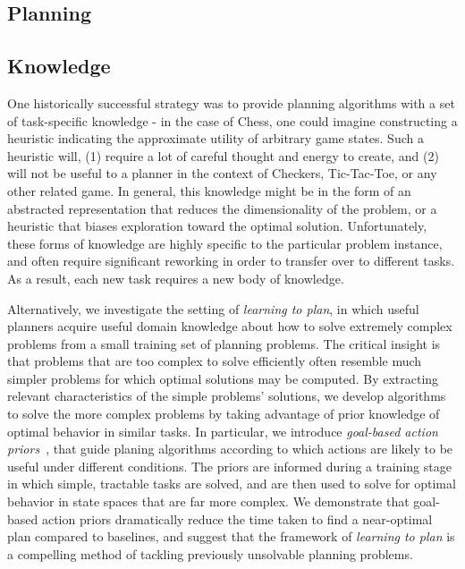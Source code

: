 \documentclass[11pt]{article}
\begin{document}
\subsection{Planning}



\subsection{Knowledge}
One historically successful strategy was to provide planning algorithms with a set of task-specific knowledge - in the case of Chess, one could imagine constructing a heuristic indicating the approximate utility of arbitrary game states. Such a heuristic will, (1) require a lot of careful thought and energy to create, and (2) will not be useful to a planner in the context of Checkers, Tic-Tac-Toe, or any other related game. In general, this knowledge might be in the form of an abstracted representation that reduces the dimensionality of the problem, or a heuristic that biases exploration toward the optimal solution. Unfortunately, these forms of knowledge are highly specific to the particular problem instance, and often require significant reworking in order to transfer over to different tasks. As a result, each new task requires a new body of knowledge. 

Alternatively, we investigate the setting of {\it learning to plan}, in which useful planners acquire useful domain knowledge about how to solve extremely complex problems from a small training set of planning problems. The critical insight is that problems that are too complex to solve efficiently often resemble much simpler problems for which optimal solutions may be computed. By extracting relevant characteristics of the simple problems' solutions, we develop algorithms to solve the more complex problems by taking advantage of prior knowledge of optimal behavior in similar tasks. In particular, we introduce {\it goal-based action priors}~\cite{abel2015goal}, that guide planing algorithms according to which actions are likely to be useful under different conditions. The priors are informed during a training stage in which simple, tractable tasks are solved, and are then used to solve for optimal behavior in state spaces that are far more complex. We demonstrate that goal-based action priors dramatically reduce the time taken to find a near-optimal plan compared to baselines, and suggest that the framework of {\it learning to plan} is a compelling method of tackling previously unsolvable planning problems.
\end{document}
